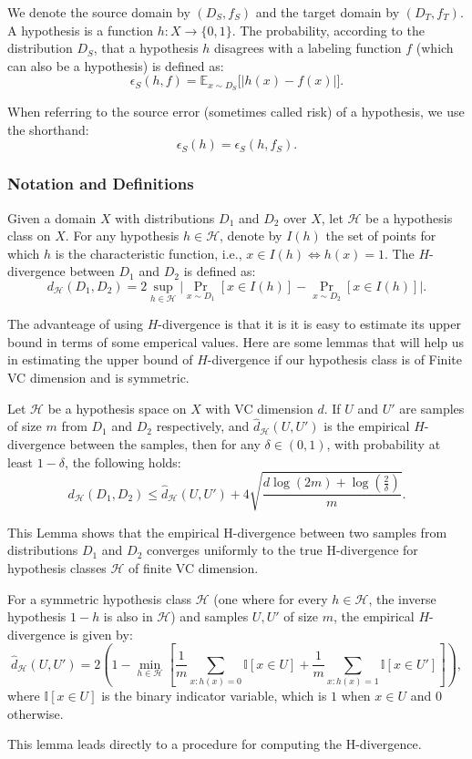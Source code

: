 \documentclass{article}
\begin{document}
We denote the source domain by $(D_S, f_S)$ and the target domain by $(D_T, f_T)$. A hypothesis is a function $h : X \to \{0,1\}$. The probability, according to the distribution $D_S$, that a hypothesis $h$ disagrees with a labeling function $f$ (which can also be a hypothesis) is defined as:
\[
\epsilon_S(h, f) = \mathbb{E}_{x \sim D_S} \big[ |h(x) - f(x)| \big].
\]

When referring to the source error (sometimes called risk) of a hypothesis, we use the shorthand:
\[
\epsilon_S(h) = \epsilon_S(h, f_S).
\]

\subsubsection{Notation and Definitions}
\begin{definition}
    Given a domain $X$ with distributions $D_1$ and $D_2$ over $X$, let $\mathcal{H}$ be a hypothesis class on $X$. For any hypothesis $h \in \mathcal{H}$, denote by $I(h)$ the set of points for which $h$ is the characteristic function, i.e., $x \in I(h) \iff h(x) = 1$. The $H$-divergence between $D_1$ and $D_2$ is defined as:
    \[
    d_{\mathcal{H}}(D_1, D_2) = 2 \sup_{h \in \mathcal{H}} \big| \Pr_{x \sim D_1}[x \in I(h)] - \Pr_{x \sim D_2}[x \in I(h)] \big|.
    \]
\end{definition}
The advanteage of using $H$-divergence is that it is it is easy to estimate its upper bound in terms of some emperical values. Here are some lemmas that will help us in estimating the upper bound of $H$-divergence if our hypothesis class is of Finite VC dimension and is symmetric.\\
\begin{lemma}
Let $\mathcal{H}$ be a hypothesis space on $X$ with VC dimension $d$. If $U$ and $U'$ are samples of size $m$ from $D_1$ and $D_2$ respectively, and $\hat{d}_{\mathcal{H}}(U, U')$ is the empirical $H$-divergence between the samples, then for any $\delta \in (0,1)$, with probability at least $1 - \delta$, the following holds:
\[
d_{\mathcal{H}}(D_1, D_2) \leq \hat{d}_{\mathcal{H}}(U, U') + 4 \sqrt{\frac{d \log(2m) + \log\left(\frac{2}{\delta}\right)}{m}}.
\]
\end{lemma}
This Lemma shows that the empirical H-divergence between two samples from distributions
$D_1$ and $D_2$ converges uniformly to the true H-divergence for hypothesis classes $\mathcal{H}$ of finite VC dimension.
\begin{lemma}
For a symmetric hypothesis class $\mathcal{H}$ (one where for every $h \in \mathcal{H}$, the inverse hypothesis $1 - h$ is also in $\mathcal{H}$) and samples $U, U'$ of size $m$, the empirical $H$-divergence is given by:
\[
\hat{d}_{\mathcal{H}}(U, U') = 2 \left( 1 - \min_{h \in \mathcal{H}} \left[ \frac{1}{m} \sum_{x : h(x) = 0} \mathbb{I}[x \in U] + \frac{1}{m} \sum_{x : h(x) = 1} \mathbb{I}[x \in U'] \right] \right),
\]
where $\mathbb{I}[x \in U]$ is the binary indicator variable, which is $1$ when $x \in U$ and $0$ otherwise.
\end{lemma}
This lemma leads directly to a procedure for computing the H-divergence.
\end{document}
